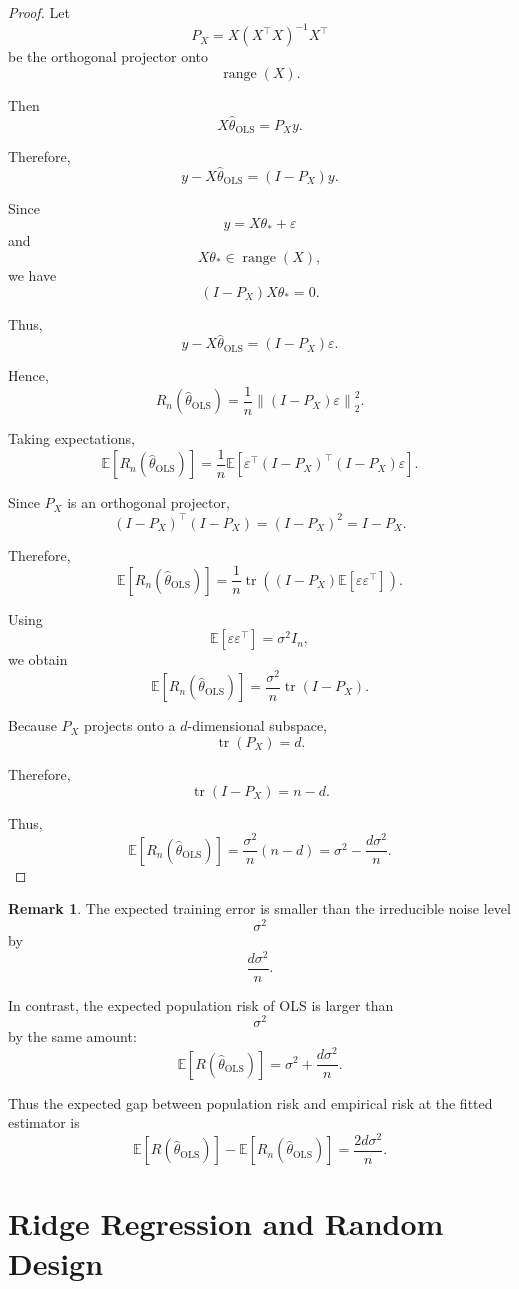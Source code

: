 \documentclass[12pt,oneside]{book}
\numberwithin{equation}{section}
\theoremstyle{definition}
\newtheorem{remark}{Remark}[section]
\theoremstyle{plain}
\theoremstyle{remark}
\newcommand{\E}{\mathbb{E}}
\newcommand{\norm}[1]{\left\lVert #1 \right\rVert}
\newcommand{\tr}{\operatorname{tr}}
\begin{document}
\begin{proof}
Let
\[
P_X=X(X^\top X)^{-1}X^\top
\]
be the orthogonal projector onto
\[
\operatorname{range}(X).
\]

Then
\[
X\widehat{\theta}_{\mathrm{OLS}}
=
P_Xy.
\]

Therefore,
\[
y-X\widehat{\theta}_{\mathrm{OLS}}
=
(I-P_X)y.
\]

Since
\[
y=X\theta_*+\varepsilon
\]
and
\[
X\theta_*\in\operatorname{range}(X),
\]
we have
\[
(I-P_X)X\theta_*=0.
\]

Thus,
\[
y-X\widehat{\theta}_{\mathrm{OLS}}
=
(I-P_X)\varepsilon.
\]

Hence,
\[
R_n(\widehat{\theta}_{\mathrm{OLS}})
=
\frac{1}{n}\norm{(I-P_X)\varepsilon}_2^2.
\]

Taking expectations,
\[
\E[R_n(\widehat{\theta}_{\mathrm{OLS}})]
=
\frac{1}{n}
\E[
\varepsilon^\top(I-P_X)^\top(I-P_X)\varepsilon
].
\]

Since $P_X$ is an orthogonal projector,
\[
(I-P_X)^\top(I-P_X)
=
(I-P_X)^2
=
I-P_X.
\]

Therefore,
\[
\E[R_n(\widehat{\theta}_{\mathrm{OLS}})]
=
\frac{1}{n}
\tr\left(
(I-P_X)\E[\varepsilon\varepsilon^\top]
\right).
\]

Using
\[
\E[\varepsilon\varepsilon^\top]=\sigma^2I_n,
\]
we obtain
\[
\E[R_n(\widehat{\theta}_{\mathrm{OLS}})]
=
\frac{\sigma^2}{n}
\tr(I-P_X).
\]

Because $P_X$ projects onto a $d$-dimensional subspace,
\[
\tr(P_X)=d.
\]

Therefore,
\[
\tr(I-P_X)=n-d.
\]

Thus,
\[
\E[R_n(\widehat{\theta}_{\mathrm{OLS}})]
=
\frac{\sigma^2}{n}(n-d)
=
\sigma^2-\frac{d\sigma^2}{n}.
\]
\end{proof}

\begin{remark}
The expected training error is smaller than the irreducible noise level
\[
\sigma^2
\]
by
\[
\frac{d\sigma^2}{n}.
\]

In contrast, the expected population risk of OLS is larger than
\[
\sigma^2
\]
by the same amount:
\[
\E[R(\widehat{\theta}_{\mathrm{OLS}})]
=
\sigma^2+\frac{d\sigma^2}{n}.
\]

Thus the expected gap between population risk and empirical risk at the fitted estimator is
\[
\E[R(\widehat{\theta}_{\mathrm{OLS}})]
-
\E[R_n(\widehat{\theta}_{\mathrm{OLS}})]
=
\frac{2d\sigma^2}{n}.
\]
\end{remark}

\chapter{Ridge Regression and Random Design}
\end{document}
